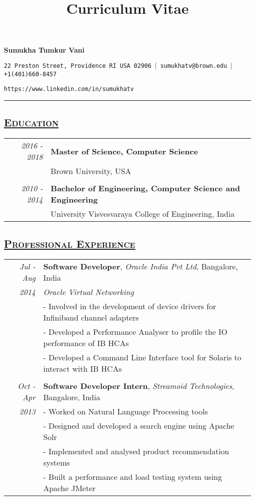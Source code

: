 \documentclass[14pt]{article}
\newenvironment{nscenter}
 {\parskip=0pt\par\nopagebreak\centering}
 {\par\noindent\ignorespacesafterend}
\begin{document}
\title{Curriculum Vitae}


\centerline{\huge{\textbf{Sumukha Tumkur Vani}}}

\centerline{\small{\texttt{22 Preston Street, Providence RI USA 02906 $|$ sumukhatv@brown.edu $|$ +1(401)660-8457}}}
\centerline{\small{\texttt{https://www.linkedin.com/in/sumukhatv}}}
\begin{nscenter}
\rule{\textwidth}{0.2pt}
\end{nscenter}

\subsection* {\scshape\large\uline {Education}}
\begin{tabularx}{\textwidth}{r X}
\emph{2016 - 2018} & \textbf{Master of Science, Computer Science} \\
		   & Brown University, USA\\
\\
\emph{2010 - 2014} & \textbf{Bachelor of Engineering, Computer Science and Engineering} \\
		   & University Visvesvaraya College of Engineering, India\\
\end{tabularx}


\subsection* {\scshape\large\uline {Professional Experience}}

\begin{tabularx}{\textwidth}{r X}
\emph{Jul - Aug} & \textbf{Software Developer}, \textit{Oracle India Pvt Ltd}, Bangalore, India \\
\emph{2014  \enskip 2016}                & \emph{Oracle Virtual Networking}\\ 
			                 & - Involved in the development of device drivers for Infiniband channel adapters\\
			                 & - Developed a Performance Analyser to profile the IO performance of IB HCAs\\
			                 & - Developed a Command Line Interface tool for Solaris to interact with IB HCAs
\\\\
\emph{Oct - Apr} & \textbf{Software Developer Intern}, \textit{Streamoid Technologies}, Bangalore, India \\ 
\emph{2013 \enskip 2014}            & - Worked on Natural Language Processing tools \\
		 	            	& - Designed and developed a search engine using Apache Solr \\
   			           	& - Implemented and analysed product recommendation systems \\
			           	& - Built a performance and load testing system using Apache JMeter
\end{tabularx}
\end{document}
